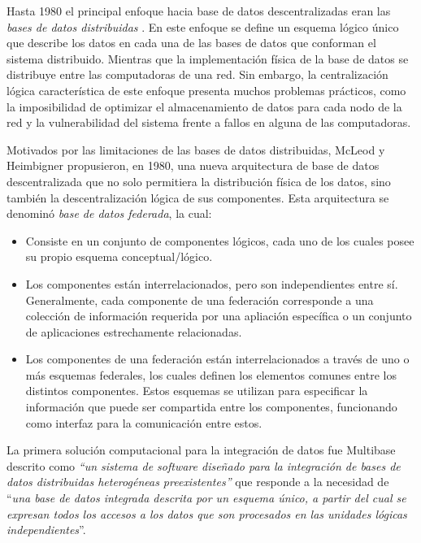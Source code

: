 Hasta 1980 el principal enfoque hacia base de datos descentralizadas eran las
\textit{bases de datos distribuidas} \cite{mcleod1980federated}. En este enfoque se define un esquema lógico
único que describe los datos en cada una de las bases de datos que conforman el sistema distribuido. Mientras que la implementación
física de la base de datos se distribuye entre las computadoras de una red. Sin embargo,
la centralización lógica característica de este enfoque presenta muchos problemas prácticos, como la
imposibilidad de optimizar el almacenamiento de datos para cada nodo de la red y la vulnerabilidad del sistema frente a fallos en alguna de las computadoras.


Motivados por las limitaciones de las bases de datos distribuidas, McLeod y Heimbigner \cite{mcleod1980federated} propusieron, en 1980, una nueva
arquitectura de base de datos descentralizada que no solo permitiera la distribución física de los datos, sino también
la descentralización lógica de sus componentes. Esta arquitectura se denominó \textit{base de datos federada}, la cual:

\begin{itemize}
    \item Consiste en un conjunto de componentes lógicos, cada uno de los cuales posee su propio esquema conceptual/lógico.
    \item Los componentes están interrelacionados, pero son independientes entre sí. Generalmente, cada componente de una federación
    corresponde a una colección de información requerida por una apliación específica o un conjunto de aplicaciones
    estrechamente relacionadas.
    \item Los componentes de una federación están interrelacionados a través de uno o más esquemas federales, los cuales definen 
    los elementos comunes entre los distintos componentes. Estos esquemas se utilizan para especificar la información  que puede ser compartida
    entre los componentes, funcionando como interfaz para la comunicación entre estos.
\end{itemize}

La primera solución computacional para la integración de datos fue Multibase \cite{smith1981multibase} descrito como \textit{``un sistema de software
diseñado para la integración de bases de datos distribuidas heterogéneas preexistentes''} que responde a la necesidad
de ``\textit{una base de datos integrada descrita por un esquema único, a partir del cual se expresan todos los accesos a los datos que son
procesados en las unidades lógicas independientes}''.

